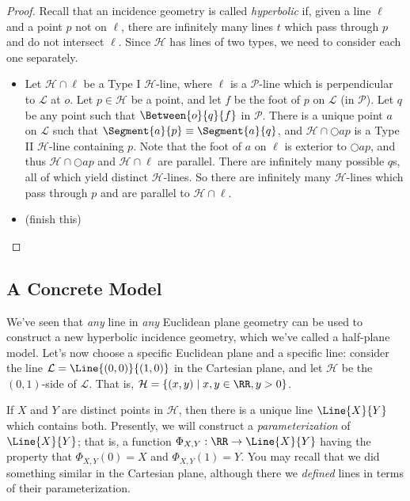 \documentclass{article}
\begin{document}
\begin{proof}
Recall that an incidence geometry is called \emph{hyperbolic} if, given a line $\ell$ and a point $p$ not on $\ell$, there are infinitely many lines $t$ which pass through $p$ and do not intersect $\ell$. Since $\mathcal{H}$ has lines of two types, we need to consider each one separately.
\begin{itemize}
\item Let $\mathcal{H} \cap \ell$ be a Type I $\mathcal{H}$-line, where $\ell$ is a $\mathcal{P}$-line which is perpendicular to $\mathcal{L}$ at $o$. Let $p \in \mathcal{H}$ be a point, and let $f$ be the foot of $p$ on $\mathcal{L}$ (in $\mathcal{P}$). Let $q$ be any point such that $\Between{o}{q}{f}$ in $\mathcal{P}$. There is a unique point $a$ on $\mathcal{L}$ such that $\Segment{a}{p} \equiv \Segment{a}{q}$, and $\mathcal{H} \cap \Circle{a}{p}$ is a Type II $\mathcal{H}$-line containing $p$. Note that the foot of $a$ on $\ell$ is exterior to $\Circle{a}{p}$, and thus $\mathcal{H} \cap \Circle{a}{p}$ and $\mathcal{H} \cap \ell$ are parallel. There are infinitely many possible $q$s, all of which yield distinct $\mathcal{H}$-lines. So there are infinitely many $\mathcal{H}$-lines which pass through $p$ and are parallel to $\mathcal{H} \cap \ell$.
\item (finish this) \qedhere
\end{itemize}
\end{proof}

\subsection*{A Concrete Model}

We've seen that \emph{any} line in \emph{any} Euclidean plane geometry can be used to construct a new hyperbolic incidence geometry, which we've called a half-plane model. Let's now choose a specific Euclidean plane and a specific line: consider the line $\mathcal{L} = \Line{(0,0)}{(1,0)}$ in the Cartesian plane, and let $\mathcal{H}$ be the $(0,1)$-side of $\mathcal{L}$. That is, $\mathcal{H} = \{ (x,y) \mid x,y \in \RR, y > 0 \}$.

If $X$ and $Y$ are distinct points in $\mathcal{H}$, then there is a unique line $\Line{X}{Y}$ which contains both. Presently, we will construct a \emph{parameterization} of $\Line{X}{Y}$; that is, a function $\Phi_{X,Y} : \RR \rightarrow \Line{X}{Y}$ having the property that $\Phi_{X,Y}(0) = X$ and $\Phi_{X,Y}(1) = Y$. You may recall that we did something similar in the Cartesian plane, although there we \emph{defined} lines in terms of their parameterization.
\end{document}
